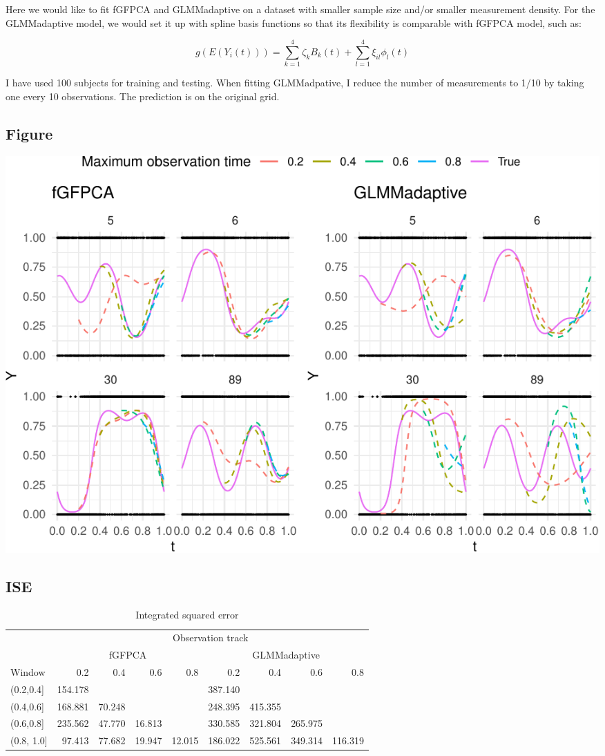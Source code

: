 \documentclass[
]{article}
\begin{document}
Here we would like to fit fGFPCA and GLMMadaptive on a dataset with
smaller sample size and/or smaller measurement density. For the
GLMMadaptive model, we would set it up with spline basis functions so
that its flexibility is comparable with fGFPCA model, such as:

\[g(E(Y_i(t))) = \sum_{k=1}^4\zeta_{k}B_k(t)+\sum_{l=1}^4\xi_{il}\phi_l(t)\]

I have used 100 subjects for training and testing. When fitting
GLMMadpative, I reduce the number of measurements to 1/10 by taking one
every 10 observations. The prediction is on the original grid.

\hypertarget{figure-1}{%
\subsection{Figure}\label{figure-1}}

\includegraphics{manuscript_files/figure-latex/unnamed-chunk-7-1.pdf}

\hypertarget{ise-1}{%
\subsection{ISE}\label{ise-1}}

\begin{table}

\caption{\label{tab:unnamed-chunk-8}Integrated squared error}
\centering
\begin{tabular}[t]{l|r|r|r|r|r|r|r|r}
\hline
\multicolumn{1}{c|}{ } & \multicolumn{8}{c}{Observation track} \\
\cline{2-9}
\multicolumn{1}{c|}{ } & \multicolumn{4}{c|}{fGFPCA} & \multicolumn{4}{c}{GLMMadaptive} \\
\cline{2-5} \cline{6-9}
Window & 0.2 & 0.4 & 0.6 & 0.8 & 0.2 & 0.4 & 0.6 & 0.8\\
\hline
(0.2,0.4] & 154.178 &  &  &  & 387.140 &  &  & \\
\hline
(0.4,0.6] & 168.881 & 70.248 &  &  & 248.395 & 415.355 &  & \\
\hline
(0.6,0.8] & 235.562 & 47.770 & 16.813 &  & 330.585 & 321.804 & 265.975 & \\
\hline
(0.8, 1.0] & 97.413 & 77.682 & 19.947 & 12.015 & 186.022 & 525.561 & 349.314 & 116.319\\
\hline
\end{tabular}
\end{table}
\end{document}
